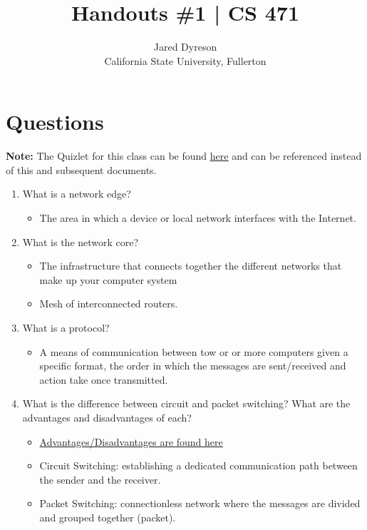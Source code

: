 \documentclass{article}
\title{Handouts \#1 | CS 471}
\author{Jared Dyreson\\ 
        California State University, Fullerton}
\begin{document}
\maketitle
\tableofcontents

\newpage

\section{Questions}

\textbf{Note: } The Quizlet for this class can be found \href{https://quizlet.com/480232264/471-1-6-flash-cards/}{\underline{here}} and can be referenced instead of this and subsequent documents.

\begin{enumerate}

\item What is a network edge?
\begin{itemize}
\item The area in which a device or local network interfaces with the Internet.
\end{itemize}


\item What is the network core?
\begin{itemize}
\item The infrastructure that connects together the different networks that make up your computer system
\item Mesh of interconnected routers.
\end{itemize}


\item What is a protocol?
\begin{itemize}
\item A means of communication between tow or or more computers given a specific format, the order in which the messages are sent/received and action take once transmitted.
\end{itemize}

\item What is the difference between circuit and packet switching? What are the advantages and disadvantages of each?
\begin{itemize}
\item \href{https://byjus.com/physics/difference-between-circuit-switching-and-packet-switching/}{Advantages/Disadvantages are found \underline{here}}
\item Circuit Switching: establishing a dedicated communication path between the sender and the receiver.
\item Packet Switching: connectionless network where the messages are divided and grouped together (packet).
\end{itemize}


\end{enumerate}
\end{document}
